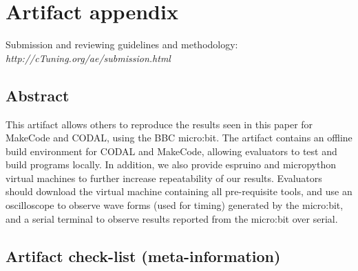 \appendix

\section{Artifact appendix}

Submission and reviewing guidelines and methodology: \\
{\em http://cTuning.org/ae/submission.html}

\subsection{Abstract}

This artifact allows others to reproduce the results seen in this paper for MakeCode and CODAL, using the BBC micro:bit. The artifact contains an offline build environment for CODAL and MakeCode, allowing evaluators to test and build programs locally. In addition, we also provide espruino and micropython virtual machines to further increase repeatability of our results. Evaluators should download the virtual machine containing all pre-requisite tools, and use an oscilloscope to observe wave forms (used for timing) generated by the micro:bit, and a serial terminal to observe results reported from the micro:bit over serial.


\subsection{Artifact check-list (meta-information)}

